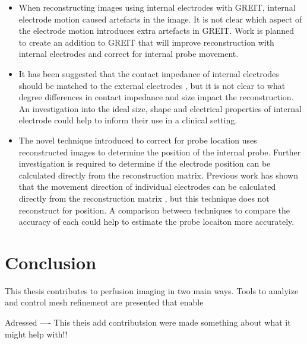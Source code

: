 \begin{itemize}
	\item When reconstructing images using internal electrodes with GREIT, 
	internal electrode motion 
	caused artefacts in the image. 
	It is not clear which aspect of the electrode motion introduces extra artefacts in GREIT.
	Work is planned to create an addition to 
	GREIT that will improve reconstruction 
	with internal electrodes and correct for internal probe movement. 

	\item It has been suggested that the contact impedance of internal 
	electrodes should be matched to the
	external electrodes \parencite{nasehi_tehrani_evaluation_2012}, 
	but it is not clear to what degree
	differences in contact impedance and size impact the reconstruction. 
	An investigation into the ideal size, shape and 
	electrical properties of internal electrode 
	could help to inform their use in a clinical setting. 

	\item The novel technique introduced to correct for probe location uses reconstructed images 
	to determine the position of the internal probe. Further investigation is required to determine 
	if the electrode position can be calculated directly from the reconstruction matrix. Previous
	work has shown that 
	the movement direction of individual electrodes can be 
	calculated directly from the reconstruction matrix 
	\parencite{soleimani_imaging_2006}, but this technique does not reconstruct for position. 
	A comparison between techniques to compare the accuracy of each could help to 
	estimate the probe locaiton more accurately.
\end{itemize}

\section{Conclusion}
This thesis contributes to perfusion imaging in two main ways. 
Tools to analyize and control
mesh refinement are presented that enable 

Adressed ---- This theis add contributsion were made something about what it might help with!!



%
%
%
%
%